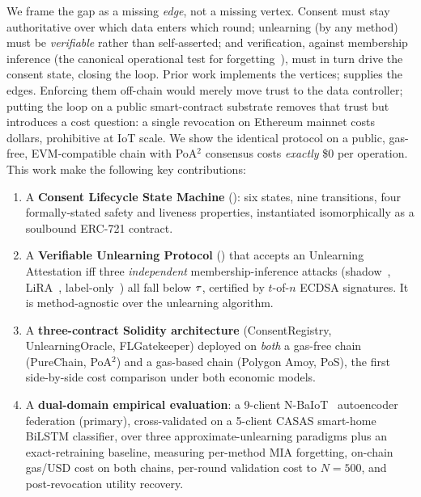 We frame the gap as a missing \emph{edge}, not a missing vertex.
Consent must stay authoritative over which data enters which round;
unlearning (by any method) must be \emph{verifiable} rather than
self-asserted; and verification, against membership inference (the
canonical operational test for
forgetting~\cite{shokri2017mia,carlini2022lira,choquettechoo2021labelonly}),
must in turn drive the consent state, closing the loop. Prior
work implements the vertices; \sysname supplies the edges. Enforcing
them off-chain would merely move trust to the data controller;
putting the loop on a public smart-contract substrate removes that
trust but introduces a cost question: a single revocation on
Ethereum mainnet costs dollars, prohibitive at IoT scale. We show
the identical protocol on a public, gas-free, EVM-compatible chain
with PoA$^2$ consensus costs \emph{exactly} \$0 per operation.
This work make the following key contributions:
\begin{enumerate}[leftmargin=*]
    \item A \textbf{Consent Lifecycle State Machine} (\clsm): six
        states, nine transitions, four formally-stated safety and
        liveness properties, instantiated isomorphically as a
        soulbound ERC-721 contract.
    \item A \textbf{Verifiable Unlearning Protocol} (\vup) that
        accepts an Unlearning Attestation iff three \emph{independent}
        membership-inference attacks
        (shadow~\cite{shokri2017mia}, LiRA~\cite{carlini2022lira},
        label-only~\cite{choquettechoo2021labelonly}) all fall below
        $\tau$, certified by $t$-of-$n$ ECDSA signatures. It is
        method-agnostic over the unlearning algorithm.
    \item A \textbf{three-contract Solidity architecture}
        (ConsentRegistry, UnlearningOracle, FLGatekeeper) deployed on
        \emph{both} a gas-free chain (PureChain, PoA$^2$) and a
        gas-based chain (Polygon Amoy, PoS), the first
        side-by-side cost comparison under both economic models.
    \item A \textbf{dual-domain empirical evaluation}: a 9-client
        N-BaIoT~\cite{meidan2018nbaiot} autoencoder federation
        (primary), cross-validated on a 5-client CASAS smart-home
        BiLSTM classifier, over three approximate-unlearning
        paradigms plus an exact-retraining baseline, measuring
        per-method MIA forgetting, on-chain gas/USD cost on both
        chains, per-round validation cost to $N\!=\!500$, and
        post-revocation utility recovery.
\end{enumerate}
